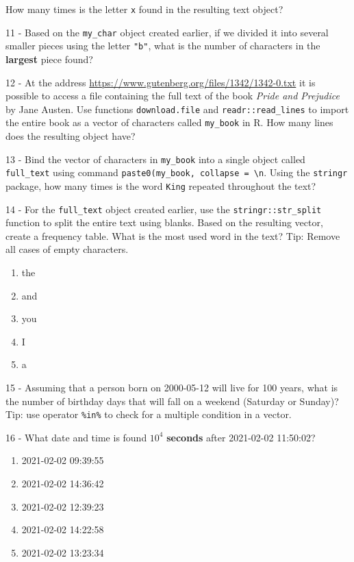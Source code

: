 \documentclass[
  12pt,
]{book}
\providecommand{\tightlist}{%
  \setlength{\itemsep}{0pt}\setlength{\parskip}{0pt}}
\begin{document}
How many times is the letter \texttt{\textquotesingle{}x\textquotesingle{}} found in the resulting text object?

11 -
Based on the \texttt{my\_char} object created earlier, if we divided it into several smaller pieces using the letter \texttt{"b"}, what is the number of characters in the \textbf{largest} piece found?

12 -
At the address \url{https://www.gutenberg.org/files/1342/1342-0.txt} it is possible to access a file containing the full text of the book \emph{Pride and Prejudice} by Jane Austen. Use functions \texttt{download.file} and \texttt{readr::read\_lines} to import the entire book as a vector of characters called \texttt{my\_book} in R. How many lines does the resulting object have?

13 -
Bind the vector of characters in \texttt{my\_book} into a single object called \texttt{full\_text} using command \texttt{paste0(my\_book,\ collapse\ =\ \textquotesingle{}\textbackslash{}n\textquotesingle{}}. Using the \texttt{stringr} package, how many times is the word \texttt{\textquotesingle{}King\textquotesingle{}} repeated throughout the text?

14 -
For the \texttt{full\_text} object created earlier, use the \texttt{stringr::str\_split} function to split the entire text using blanks. Based on the resulting vector, create a frequency table. What is the most used word in the text? Tip: Remove all cases of empty characters.

\begin{enumerate}
\def\labelenumi{\alph{enumi})}
\tightlist
\item
  the
\item
  and
\item
  you
\item
  I
\item
  a
\end{enumerate}

15 -
Assuming that a person born on 2000-05-12 will live for 100 years, what is the number of birthday days that will fall on a weekend (Saturday or Sunday)? Tip: use operator \texttt{\%in\%} to check for a multiple condition in a vector.

16 -
What date and time is found \ensuremath{10^{4}} \textbf{seconds} after 2021-02-02 11:50:02?

\begin{enumerate}
\def\labelenumi{\alph{enumi})}
\tightlist
\item
  2021-02-02 09:39:55
\item
  2021-02-02 14:36:42
\item
  2021-02-02 12:39:23
\item
  2021-02-02 14:22:58
\item
  2021-02-02 13:23:34
\end{enumerate}
\end{document}
